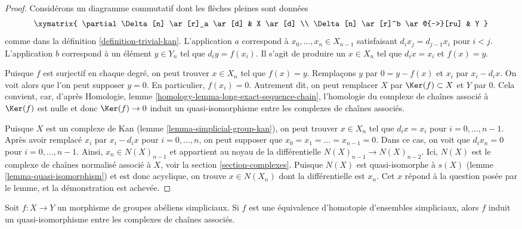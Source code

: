 \begin{proof}
Considérons un diagramme commutatif dont les flèches pleines sont données
$$
\xymatrix{
\partial \Delta[n] \ar[r]_a \ar[d] & X \ar[d] \\
\Delta[n] \ar[r]^b \ar@{-->}[ru] & Y
}
$$
comme dans la définition \ref{definition-trivial-kan}. L'application $a$
correspond à $x_0, \ldots, x_n \in X_{n - 1}$ satisfaisant
$d_i x_j = d_{j - 1} x_i$ pour $i < j$. L'application $b$ correspond à un
élément $y \in Y_n$ tel que $d_iy = f(x_i)$. Il s'agit de produire un
$x \in X_n$ tel que $d_ix = x_i$ et $f(x) = y$.

\medskip\noindent
Puisque $f$ est surjectif en chaque degré, on peut trouver $x \in X_n$ tel que
$f(x) = y$. Remplaçons $y$ par $0 = y - f(x)$ et $x_i$ par $x_i - d_ix$.
On voit alors que l'on peut supposer $y = 0$. En particulier,
$f(x_i) = 0$. Autrement dit, on peut remplacer $X$ par
$\Ker(f) \subset X$ et $Y$ par $0$. Cela convient, car, d'après
Homologie, lemme \ref{homology-lemma-long-exact-sequence-chain},
l'homologie du complexe de chaînes associé à $\Ker(f)$
est nulle et donc $\Ker(f) \to 0$ induit un quasi-isomorphisme
entre les complexes de chaînes associés.

\medskip\noindent
Puisque $X$ est un complexe de Kan (lemme
\ref{lemma-simplicial-group-kan}), on peut trouver $x \in X_n$ tel que
$d_i x = x_i$ pour $i = 0, \ldots, n - 1$.
Après avoir remplacé $x_i$ par $x_i - d_ix$ pour $i = 0, \ldots, n$, on
peut supposer que $x_0 = x_1 = \ldots = x_{n - 1} = 0$.
Dans ce cas, on voit que $d_i x_n = 0$ pour $i = 0, \ldots, n - 1$.
Ainsi, $x_n \in N(X)_{n - 1}$ et appartient au noyau de la différentielle
$N(X)_{n - 1} \to N(X)_{n - 2}$. Ici, $N(X)$ est le complexe de chaînes
normalisé associé à $X$, voir la section \ref{section-complexes}.
Puisque $N(X)$ est quasi-isomorphe à $s(X)$
(lemme \ref{lemma-quasi-isomorphism})
et est donc acyclique, on trouve $x \in N(X_n)$ dont la différentielle est
$x_n$. Cet $x$ répond à la question posée par le lemme, et la démonstration
est achevée.
\end{proof}

\begin{lemma}
\label{lemma-homotopy-equivalence}
Soit $f : X \to Y$ un morphisme de groupes abéliens simpliciaux. Si $f$
est une équivalence d'homotopie d'ensembles simpliciaux, alors $f$ induit
un quasi-isomorphisme entre les complexes de chaînes associés.
\end{lemma}

